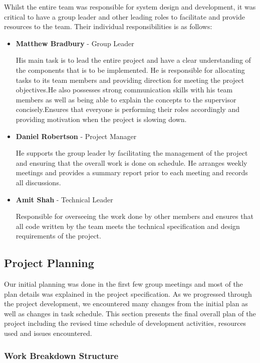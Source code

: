 Whilst the entire team was responsible for system design and development, it was critical to have a group leader and other leading roles to facilitate and provide resources to the team. Their individual responsibilities is as follows:

\begin{itemize}
	\item[] {\bf Matthew Bradbury} - Group Leader
	
	His main task is to lead the entire project and have a clear understanding of the components that is to be implemented. He is responsible for allocating tasks to its team members and providing direction for meeting the project objectives.He also possesses strong communication skills with his team members as well as being able to explain the concepts to the supervisor concisely.Ensures that everyone is performing their roles accordingly and providing motivation when the project is slowing down.	

	\item[] {\bf Daniel Robertson} - Project Manager
	
	He supports the group leader by facilitating the management of the project and ensuring that the overall work is done on schedule. He arranges weekly meetings and provides a summary report prior to each meeting and records all discussions.
	
	\item[] {\bf Amit Shah} - Technical Leader
	
	Responsible for overseeing the work done by other members and ensures that all code written by the team meets the technical specification and design requirements of the project.	
	
\end{itemize}

\subsection{Project Planning}

Our initial planning was done in the first few group meetings and most of the plan details was explained in the project specification. As we progressed through the project development, we encountered many changes from the initial plan as well as changes in task schedule. This section presents the final overall plan of the project including the revised time schedule of development activities, resources used and issues encountered.

\subsubsection{Work Breakdown Structure}

